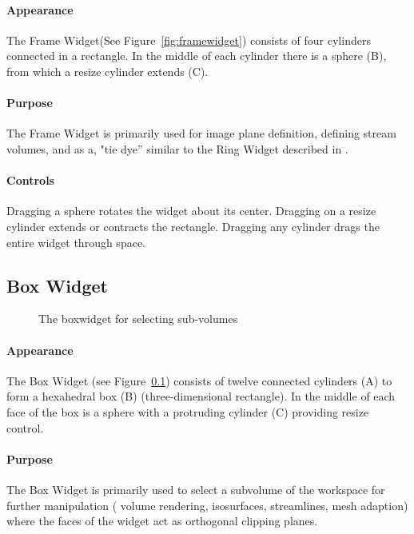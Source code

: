\paragraph{Appearance} The
Frame Widget(See Figure~\ref{fig:framewidget}) consists of four cylinders connected in a rectangle.  In
the middle of each cylinder there is a sphere (B), from which
a resize cylinder extends (C).

\paragraph{Purpose} The Frame Widget is primarily used for image
plane definition, defining stream volumes, and as a, "tie dye'' similar to
the Ring Widget described in .

\paragraph{Controls} Dragging a sphere rotates the widget about its center. Dragging on a resize cylinder extends or contracts the rectangle.
Dragging any cylinder drags the entire widget through space.


\subsection{Box Widget}
\label{sec:view-boxwidget} 

\begin{figure}[htb]
  \begin{makeimage}
  \end{makeimage}
  \boxwidget
  \caption{\label{fig:boxwidget} The boxwidget for selecting sub-volumes}
\end{figure}

\paragraph{Appearance} The Box
Widget (see Figure~\ref{sec:view-boxwidget}) consists of twelve 
connected cylinders (A) to form a hexahedral box (B) (three-dimensional
rectangle).  In the middle of each face of the box is a sphere with a protruding cylinder (C) providing resize control.

\paragraph{Purpose} The Box Widget is primarily used to select a
subvolume of the workspace for further manipulation (\eg{} volume
rendering, isosurfaces, streamlines, mesh adaption) where the faces of the
widget act as orthogonal clipping planes.

